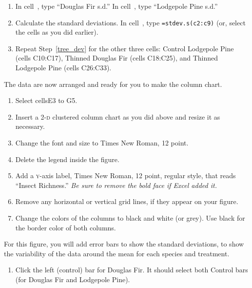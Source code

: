 \documentclass[12pt, hidelinks]{exam}
\newcommand*\xcell[1]{cell~\liningnum{#1}}
\newcommand*\axis[1]{{\scshape #1}-axis}
\begin{document}
\begin{questions}
\begin{enumerate}
	\item \label{tree_dev} In \xcell{I3}, type ``Douglas Fir s.d.'' In \xcell{J3}, type ``Lodgepole Pine s.d.''
	
	\item Calculate the standard deviations. In \xcell{I4}, type \texttt{=stdev.s(c2:c9)} (or, select the cells as you did earlier).
	
	\item Repeat Step~\ref{tree_dev} for the other three cells: Control Lodgepole Pine (cells {\liningnum C10:C17}), Thinned Douglas Fir (cells {\liningnum C18:C25}), and Thinned Lodgepole Pine (cells {\liningnum C26:C33}). 
	
\end{enumerate}

The data are now arranged and ready for you to make the column chart.

\begin{enumerate}[resume]
	\item Select cells{\liningnum E3 to G5}.

	\item Insert a 2-\textsc{d} clustered column chart as you did above and resize it as necessary.
	
	\item Change the font and size to Times New Roman, 12 point.
	
	\item Delete the legend inside the figure.
	
	\item Add a \axis{y} label, Times New Roman, 12 point, regular style, that reads “Insect Richness.” \emph{Be sure to remove the bold face if Excel added it.}
	
	\item Remove any horizontal or vertical grid lines, if they appear on your figure.
	
	\item Change the colors of the columns to black and white (or grey). Use black for the border color of both columns.
	
\end{enumerate}

For this figure, you will add error bars to show the standard deviations, to show the variability of the data around the mean for each species and treatment.

\begin{enumerate}[resume]

	\item Click the left (control) bar for Douglas Fir. It should select both Control bars (for Douglas Fir and Lodgepole Pine). 
	

\end{enumerate}
\end{questions}
\end{document}
